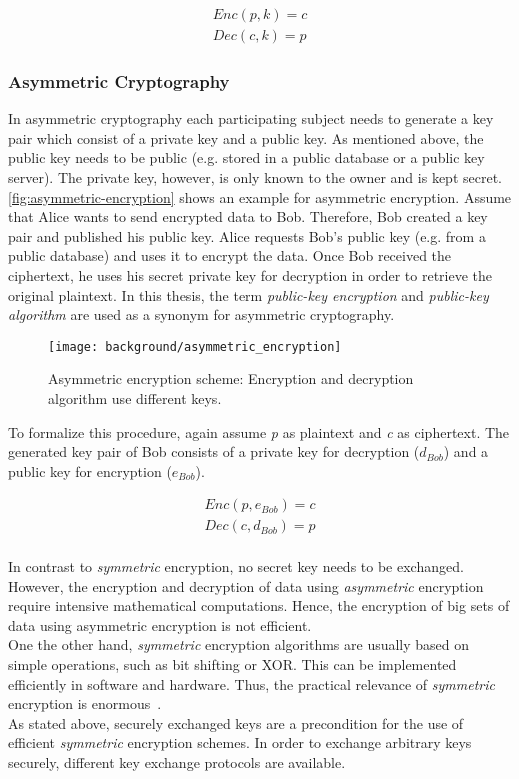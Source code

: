 \begin{align*}
Enc(p, k) = c\\
Dec(c, k) = p
\end{align*}

\subsubsection{Asymmetric Cryptography}

In asymmetric cryptography each participating subject needs to generate a key pair which consist of a private key and a public key. As mentioned above, the public key needs to be public (e.g. stored in a public database or a public key server). The private key, however, is only known to the owner and is kept secret.
\autoref{fig:asymmetric-encryption} shows an example for asymmetric encryption. Assume that Alice wants to send encrypted data to Bob. Therefore, Bob created a key pair and published his public key. Alice requests Bob's public key (e.g. from a public database) and uses it to encrypt the data. Once Bob received the ciphertext, he uses his secret private key for decryption in order to retrieve the original  plaintext. In this thesis, the term \textit{public-key encryption} and \textit{public-key algorithm} are used as a synonym for asymmetric cryptography.

\begin{figure}[htpb]
  \centering
  \texttt{[image: background/asymmetric\_encryption]}
  \caption[Asymmetric encryption scheme]{Asymmetric encryption scheme: Encryption and decryption algorithm use different keys.} \label{fig:asymmetric-encryption}
\end{figure}
To formalize this procedure, again assume \textit{p} as plaintext and \textit{c} as ciphertext. The generated key pair of Bob consists of a private key for decryption ($d_{Bob}$) and a public key for encryption ($e_{Bob}$).

\begin{align*}
Enc(p, e_{Bob}) = c\\
Dec(c, d_{Bob}) = p
\end{align*}
\\
In contrast to \textit{symmetric} encryption, no secret key needs to be exchanged. However, the encryption and decryption of data using \textit{asymmetric} encryption require intensive mathematical computations. Hence, the encryption of big sets of data using asymmetric encryption is not efficient.\\
One the other hand, \textit{symmetric} encryption algorithms are usually based on simple operations, such as bit shifting or XOR. This can be implemented efficiently in software and hardware. Thus, the practical relevance of \textit{symmetric} encryption is enormous~\parencite{ITSicherheit}.
\\
As stated above, securely exchanged keys are a precondition for the use of efficient \textit{symmetric} encryption schemes. In order to exchange arbitrary keys securely, different key exchange protocols are available.

